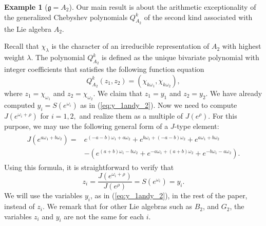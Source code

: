 \documentclass{amsart}
\newcommand{\mf}{\mathfrak}
\numberwithin{equation}{section}
\theoremstyle{plain}
\theoremstyle{definition}
\newtheorem{example}[theorem]{Example}
\begin{document}
\begin{example}[$\mf{g}=A_2$]\label{ex:QA2}
Our main result is about the arithmetic exceptionality of the generalized Chebyshev polynomials $Q^k_{A_2}$ of the second kind associated with the Lie algebra $A_2$. 

Recall that $\chi_\lambda$ is the character of an irreducible representation of $A_2$ with highest weight $\lambda$. The polynomial $Q^k_{A_2}$ is defined as the unique bivariate polynomial with integer coefficients that satisfies the following function equation
$$Q^k_{A_2}(z_1,z_2)=(\chi_{k\omega_1},\chi_{k\omega_2}),$$
where $z_1=\chi_{\omega_1}$ and $z_2=\chi_{\omega_2}$. We claim that $z_1=y_1$ and $z_2=y_2$. We have already computed $y_i=S(e^{\omega_i})$ as in (\ref{eq:y_1andy_2}). Now we need to compute $J(e^{\omega_i+\rho})$ for $i=1,2,$ and realize them as a multiple of $J(e^{\rho})$. For this purpose, we may use the following general form of a $J$-type element:
\begin{align}\label{eq:JforA2}
\begin{split}
J(e^{a\omega_1+b\omega_2})=&e^{(-a-b)\omega_1+a\omega_2}+e^{b\omega_1+(-a-b)\omega_2}+e^{a\omega_1+b\omega_2}\\
&-\left(e^{(a+b)\omega_1-b\omega_2}+e^{-a\omega_1+(a+b)\omega_2}+e^{-b\omega_1-a\omega_2}\right).	
\end{split}
\end{align}
Using this formula, it is straightforward to verify that 
$$z_i=\frac{J(e^{\omega_i+\rho})}{J(e^{\rho})} = S(e^{\omega_i})=y_i.$$
We will use the variables $y_i$, as in (\ref{eq:y_1andy_2}), in the rest of the paper, instead of $z_i$. We remark that for other Lie algebras such as $B_2$, and $G_2$, the variables $z_i$ and $y_i$ are not the same for each $i$. 


\end{example}
\end{document}
